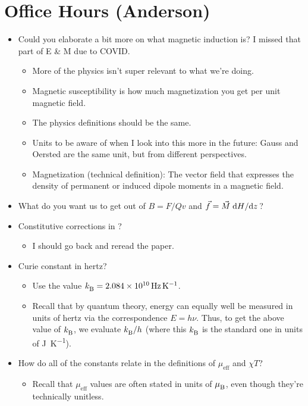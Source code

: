 \documentclass[../notes.tex]{subfiles}
\begin{document}
\section{Office Hours (Anderson)}
\begin{itemize}
    \item {}Could you elaborate a bit more on what magnetic induction is? I missed that part of E \& M due to COVID.
    \begin{itemize}
        \item More of the physics isn't super relevant to what we're doing.
        \item Magnetic susceptibility is how much magnetization you get per unit magnetic field.
        \item The physics definitions should be the same.
        \item Units to be aware of when I look into this more in the future: Gauss and Oersted are the same unit, but from different perspectives.
        \item Magnetization (technical definition): The vector field that expresses the density of permanent or induced dipole moments in a magnetic field.
    \end{itemize}
    \item What do you want us to get out of $B=F/Qv$ and $\vec{f}=\vec{M}\dv*{H}{z}$?
    \item Constitutive corrections in \textcite{bib:BerryDiamagnetism}?
    \begin{itemize}
        \item I should go back and reread the paper.
    \end{itemize}
    \item Curie constant in hertz?
    \begin{itemize}
        \item Use the value ${k_\text{B}^{}}=\SI{2.084e10}{\hertz\per\kelvin}$.
        \item Recall that by quantum theory, energy can equally well be measured in units of hertz via the correspondence $E=h\nu$. Thus, to get the above value of ${k_\text{B}^{}}$, we evaluate ${k_\text{B}^{}}/h$ (where this ${k_\text{B}^{}}$ is the standard one in units of \si{\joule\per\kelvin}).
    \end{itemize}
    \item How do all of the constants relate in the definitions of $\mu_\text{eff}$ and $\chi T$?
    \begin{itemize}
        \item Recall that $\mu_\text{eff}$ values are often stated in units of ${\mu_\text{B}^{}}$, even though they're technically unitless.

\end{itemize}
\end{itemize}
\end{document}
